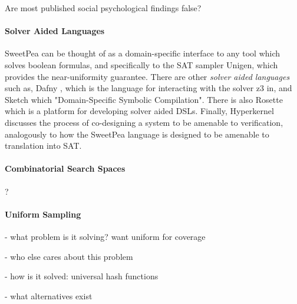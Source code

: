 Are most published social psychological findings false? \cite{stroebe2016most}


\paragraph*{Solver Aided Languages}

SweetPea can be thought of as a domain-specific interface to any tool which solves boolean formulas, and specifically to the SAT sampler Unigen, which provides the near-uniformity guarantee. There are other \emph{solver aided languages} such as, Dafny \cite{leino2013developing}, which is the language for interacting with the solver z3 in, and Sketch \cite{bodik2017domain} which "Domain-Specific Symbolic Compilation". There is also Rosette \cite{torlak2014lightweight} which is a platform for developing solver aided DSLs. Finally, Hyperkernel \cite{nelson2017hyperkernel} discusses the process of co-designing a system to be amenable to verification, analogously to how the SweetPea language is designed to be amenable to translation into SAT.


\paragraph*{Combinatorial Search Spaces}
?


\paragraph*{Uniform Sampling}

\cite{meel2016constrained}

- what problem is it solving? want uniform for coverage

- who else cares about this problem

- how is it solved: universal hash functions

- what alternatives exist
